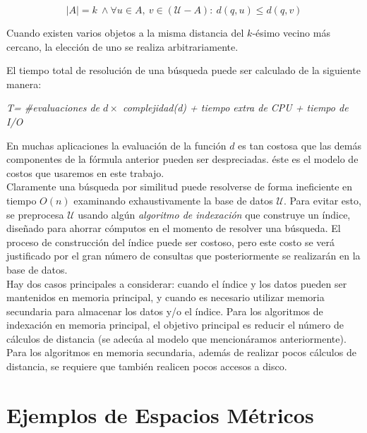 \begin{description}
          \vspace{-3mm}
         \[|A| =k \ \wedge \forall u \in A,\  v \in ( \mathcal{U} - A) :
          \ d(q,u) \leq d(q,v)\]
          
          Cuando existen varios objetos a la misma distancia del $k$-\'esimo 
          vecino m\'as cercano, la elecci\'on de uno se realiza arbitrariamente.
           
\end{description}

El tiempo total de resoluci\'on de una b\'usqueda puede ser calculado de la
siguiente manera:\\

\centerline{
    \em T= \#evaluaciones  de $d \times $ complejidad(d) +  tiempo extra de
    CPU + tiempo de  I/O
}

En muchas aplicaciones  la evaluaci\'on de la funci\'on $d$ es tan costosa
que las dem\'as componentes de la f\'ormula anterior pueden ser despreciadas.
\'este es el modelo de costos  que usaremos en este trabajo.\\

Claramente una b\'usqueda por similitud puede resolverse de forma
ineficiente en tiempo  $O(n)$ examinando exhaustivamente la base de datos $\mathcal{U}$.
Para evitar esto, se preprocesa $\mathcal{U}$ usando alg\'un {\em algoritmo de
indexaci\'on} que construye  un 
\'indice, dise\~nado  para ahorrar c\'omputos en el momento de resolver una b\'usqueda.
El proceso de  construcci\'on del \'indice puede ser costoso, pero este costo
se ver\'a justificado por el gran n\'umero de consultas que posteriormente se
realizar\'an en la base de datos.\\

Hay dos casos principales a considerar: cuando el \'indice y los datos pueden ser
mantenidos en memoria principal, y cuando es necesario utilizar memoria secundaria
para almacenar los datos y/o el \'indice. Para los algoritmos de indexaci\'on
en memoria principal, el objetivo principal es reducir el n\'umero de c\'alculos de distancia
(se adec\'ua al modelo que mencion\'aramos anteriormente).\\
  Para los algoritmos en memoria secundaria, adem\'as
de realizar pocos c\'alculos de distancia, se requiere que tambi\'en realicen
pocos accesos a disco. 


\section{Ejemplos de Espacios M\'etricos}

